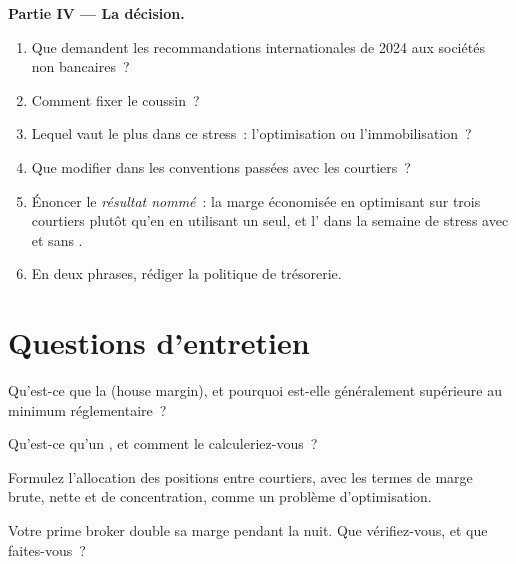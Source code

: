 \begin{problem}
\medskip\noindent\textbf{Partie IV --- La décision.}
\begin{enumerate}[resume]
\item Que demandent les recommandations internationales de 2024 aux sociétés non bancaires~?
\item Comment fixer le coussin~?
\item Lequel vaut le plus dans ce stress~: l'optimisation ou l'immobilisation~?
\item Que modifier dans les conventions passées avec les courtiers~?
\item Énoncer le \emph{résultat nommé}~: la marge économisée en optimisant sur trois courtiers plutôt qu'en en utilisant un seul, et l' dans la semaine de stress
avec et sans .
\item En deux phrases, rédiger la politique de trésorerie.
\end{enumerate}
\end{problem}

\section{Questions d'entretien}

\begin{interviewq}\label{iq:fm:treasury-and-funding:1}
Qu'est-ce que la  (house margin), et pourquoi est-elle généralement supérieure au minimum réglementaire~?
\end{interviewq}

\begin{interviewq}\label{iq:fm:treasury-and-funding:2}
Qu'est-ce qu'un , et comment le calculeriez-vous~?
\end{interviewq}

\begin{interviewq}\label{iq:fm:treasury-and-funding:3}
Formulez l'allocation des positions entre courtiers, avec les termes de marge brute, nette et de concentration, comme un problème d'optimisation.
\end{interviewq}

\begin{interviewq}\label{iq:fm:treasury-and-funding:4}
Votre prime broker double sa marge pendant la nuit. Que vérifiez-vous, et que faites-vous~?
\end{interviewq}

